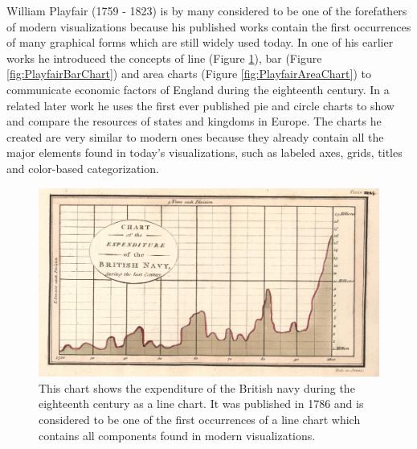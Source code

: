 William Playfair (1759 - 1823) is by many considered to be one of the forefathers of modern visualizations because his published works contain the first occurrences of many graphical forms which are still widely used today.
In one of his earlier works \parencite{CommercialAndPoliticalAtlas} he introduced the concepts of line (Figure \ref{fig:PlayfairLineChart}), bar (Figure \ref{fig:PlayfairBarChart}) and area charts (Figure \ref{fig:PlayfairAreaChart}) to communicate economic factors of England during the eighteenth century.
In a related later work \parencite{StatisticalBreviary} he uses the first ever published pie and circle charts to show and compare the resources of states and kingdoms in Europe.
The charts he created are very similar to modern ones because they already contain all the major elements found in today's visualizations, such as labeled axes, grids, titles and color-based categorization.

\begin{figure}[tp]
\centering
\includegraphics[keepaspectratio,width=\linewidth,height=\fullh / 3]{images/playfair-line-chart.png}
\caption[Line Chart by William Playfair From 1786]{
  This chart shows the expenditure of the British navy during the eighteenth century as a line chart.
  It was published in 1786 and is considered to be one of the first occurrences of a line chart which contains all components found in modern visualizations.
}
\label{fig:PlayfairLineChart}
\end{figure}

